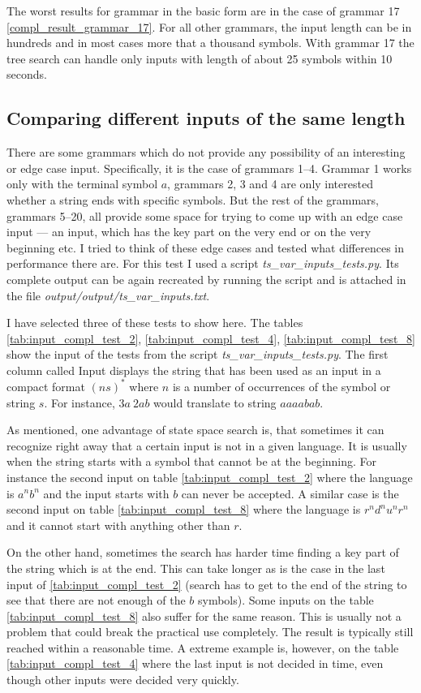 The worst results for grammar in the basic form are in the case of grammar 17 \ref{compl_result_grammar_17}. For all other grammars, the input length can be in hundreds and in most cases more that a thousand symbols. With grammar 17 the tree search can handle only inputs with length of about 25 symbols within 10 seconds.

\subsection{Comparing different inputs of the same length}
There are some grammars which do not provide any possibility of an interesting or edge case input. Specifically, it is the case of grammars 1--4. Grammar 1 works only with the terminal symbol $a$, grammars 2, 3 and 4 are only interested whether a string ends with specific symbols. But the rest of the grammars, grammars 5--20, all provide some space for trying to come up with an edge case input --- an input, which has the key part on the very end or on the very beginning etc. I tried to think of these edge cases and tested what differences in performance there are. For this test I used a script \textit{ts\_var\_inputs\_tests.py}. Its complete output can be again recreated by running the script and is attached in the file \textit{output/output/ts\_var\_inputs.txt}.

I have selected three of these tests to show here. The tables \ref{tab:input_compl_test_2}, \ref{tab:input_compl_test_4}, \ref{tab:input_compl_test_8}  show the input of the tests from the script \textit{ts\_var\_inputs\_tests.py}. The first column called Input displays the string that has been used as an input in a compact format $(ns)^*$ where $n$ is a number of occurrences of the symbol or string $s$. For instance, $3a\:2ab$ would translate to string $aaaabab$.

As mentioned, one advantage of state space search is, that sometimes it can recognize right away that a certain input is not in a given language. It is usually when the string starts with a symbol that cannot be at the beginning. For instance the second input on table \ref{tab:input_compl_test_2} where the language is $a^nb^n$ and the input starts with $b$ can never be accepted. A similar case is the second input on table \ref{tab:input_compl_test_8} where the language is $r^nd^nu^nr^n$ and it cannot start with anything other than $r$.

On the other hand, sometimes the search has harder time finding a key part of the string which is at the end. This can take longer as is the case in the last input of \ref{tab:input_compl_test_2} (search has to get to the end of the string to see that there are not enough of the $b$ symbols). Some inputs on the table \ref{tab:input_compl_test_8} also suffer for the same reason. This is usually not a problem that could break the practical use completely. The result is typically still reached within a reasonable time. A extreme example is, however, on the table \ref{tab:input_compl_test_4} where the last input is not decided in time, even though other inputs were decided very quickly.

